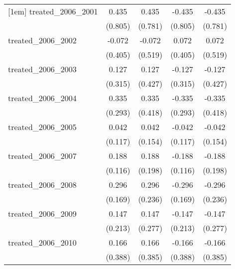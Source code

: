 {\begin{tabular}{l*{4}{c}}
[1em]
treated\_2006\_2001&       0.435         &       0.435         &      -0.435         &      -0.435         \\
            &     (0.805)         &     (0.781)         &     (0.805)         &     (0.781)         \\
[1em]
treated\_2006\_2002&      -0.072         &      -0.072         &       0.072         &       0.072         \\
            &     (0.405)         &     (0.519)         &     (0.405)         &     (0.519)         \\
[1em]
treated\_2006\_2003&       0.127         &       0.127         &      -0.127         &      -0.127         \\
            &     (0.315)         &     (0.427)         &     (0.315)         &     (0.427)         \\
[1em]
treated\_2006\_2004&       0.335         &       0.335         &      -0.335         &      -0.335         \\
            &     (0.293)         &     (0.418)         &     (0.293)         &     (0.418)         \\
[1em]
treated\_2006\_2005&       0.042         &       0.042         &      -0.042         &      -0.042         \\
            &     (0.117)         &     (0.154)         &     (0.117)         &     (0.154)         \\
[1em]
treated\_2006\_2007&       0.188         &       0.188         &      -0.188         &      -0.188         \\
            &     (0.116)         &     (0.198)         &     (0.116)         &     (0.198)         \\
[1em]
treated\_2006\_2008&       0.296         &       0.296         &      -0.296         &      -0.296         \\
            &     (0.169)         &     (0.236)         &     (0.169)         &     (0.236)         \\
[1em]
treated\_2006\_2009&       0.147         &       0.147         &      -0.147         &      -0.147         \\
            &     (0.213)         &     (0.277)         &     (0.213)         &     (0.277)         \\
[1em]
treated\_2006\_2010&       0.166         &       0.166         &      -0.166         &      -0.166         \\
            &     (0.388)         &     (0.385)         &     (0.388)         &     (0.385)         \\

\end{tabular}}
